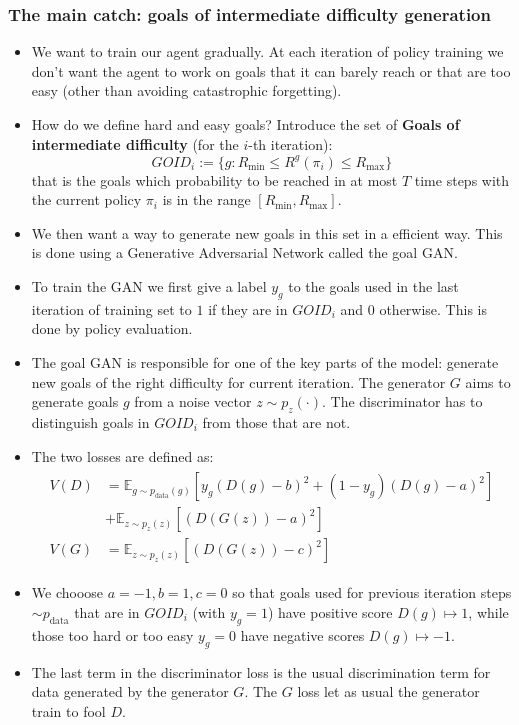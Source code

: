 \documentclass{beamer}
\theoremstyle{plain}
\theoremstyle{definition}
\theoremstyle{remark}
\newcommand{\E}{\mathds{E}}
\begin{document}
\begin{frame}
	\frametitle{The main catch: goals of intermediate difficulty generation}
	\begin{itemize}
		\item We want to train our agent gradually. At each iteration of policy training we don't want the agent to work on goals that it can barely reach or that are too easy (other than avoiding catastrophic forgetting).
  		\item How do we define hard and easy goals? Introduce the set of \textbf{Goals of intermediate difficulty} (for the $i$-th iteration):
			\begin{equation*}
				GOID_i := \{g: R_{\text{min}}\leq R^g(\pi_i)\leq R_{\text{max}}\}
			\end{equation*}
			that is the goals which probability to be reached in at most $T$ time steps with the current policy $\pi_i$ is in the range $[R_{\text{min}},R_{\text{max}}]$.
		\item We then want a way to generate new goals in this set in a efficient way. This is done using a Generative Adversarial Network called the goal GAN.
  		\item To train the GAN we first give a label $y_g$ to the goals used in the last iteration of training set to $1$ if they are in $GOID_i$ and $0$ otherwise. This is done by policy evaluation.
	\end{itemize}
\end{frame}

\begin{frame}
	\begin{itemize}
		\item The goal GAN is responsible for one of the key parts of the model: generate new goals of the right difficulty for current iteration. The generator $G$ aims to generate goals $g$ from a noise vector $z\sim p_z(\cdot)$. The discriminator has to distinguish goals in $GOID_i$ from those that are not.
		\item The two losses are defined as:
			\begin{align*}
				\begin{split}
					V(D) & = \E_{g\sim p_{\text{data}}(g)}\left[y_g(D(g)-b)^2+(1-y_g)(D(g)-a)^2\right]\\
								 & +\E_{z\sim p_z(z)}\left[(D(G(z))-a)^2\right]\\
					V(G) & = \E_{z\sim p_{z}(z)}\left[(D(G(z))-c)^2\right]
				\end{split}
			\end{align*}
		\item We chooose $a=-1, b=1, c=0$ so that goals used for previous iteration steps $\sim p_{\text{data}}$ that are in $GOID_i$ (with $y_g=1$) have positive score $D(g)\mapsto 1$, while those too hard or too easy $y_g=0$ have negative scores $D(g)\mapsto -1$.
		\item The last term in the discriminator loss is the usual discrimination term for data generated by the generator $G$. The $G$ loss let as usual the generator train to fool $D$.
	\end{itemize}
\end{frame}
\end{document}
